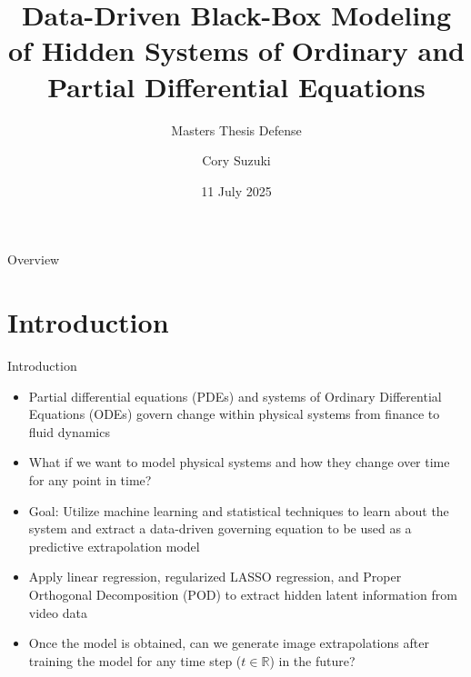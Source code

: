 \documentclass[aspectratio=169,xcolor=dvipsnames]{beamer}
\title{Data-Driven Black-Box Modeling of Hidden Systems of Ordinary and Partial Differential Equations}
\subtitle{Masters Thesis Defense}
\author{Cory Suzuki}
\institute
{
    Department of Mathematics \& Statistics \\
    California State University, Long Beach %
}
\date{11 July 2025} %
\begin{document}
\begin{frame}
    \titlepage
\end{frame}

\begin{frame}{Overview}
    \tableofcontents
\end{frame}

\section{Introduction}

\begin{frame}{Introduction}
    \begin{itemize}
        \item Partial differential equations (PDEs) and systems of Ordinary Differential Equations (ODEs) govern change within physical systems from finance to fluid dynamics
        \item What if we want to model physical systems and how they change over time for any point in time?
        \item Goal: Utilize machine learning and statistical techniques to learn about the system and extract a data-driven governing equation to be used as a predictive extrapolation model
        \item Apply linear regression, regularized LASSO regression, and Proper Orthogonal Decomposition (POD) to extract hidden latent information from video data
        \item Once the model is obtained, can we generate image extrapolations after training the model for any time step ($t \in \mathbb{R}$) in the future?
    \end{itemize}
\end{frame}


\end{document}
